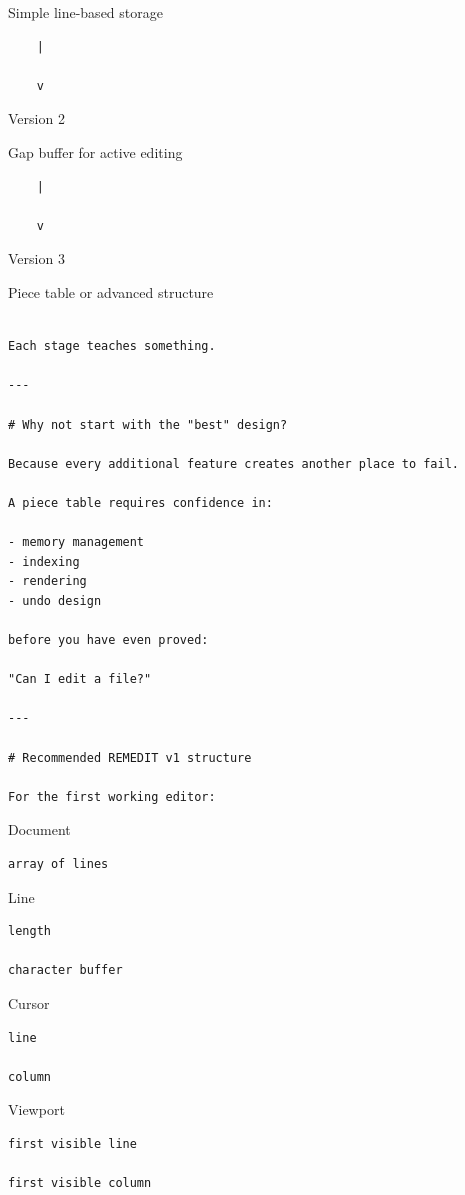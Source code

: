 \documentclass[
  oneside,
  openany]{book}
\begin{document}
Simple line-based storage

\begin{verbatim}
    |

    v
\end{verbatim}

Version 2

Gap buffer for active editing

\begin{verbatim}
    |

    v
\end{verbatim}

Version 3

Piece table or advanced structure

\begin{verbatim}

Each stage teaches something.

---

# Why not start with the "best" design?

Because every additional feature creates another place to fail.

A piece table requires confidence in:

- memory management
- indexing
- rendering
- undo design

before you have even proved:

"Can I edit a file?"

---

# Recommended REMEDIT v1 structure

For the first working editor:
\end{verbatim}

Document

\begin{verbatim}
array of lines
\end{verbatim}

Line

\begin{verbatim}
length

character buffer
\end{verbatim}

Cursor

\begin{verbatim}
line

column
\end{verbatim}

Viewport

\begin{verbatim}
first visible line

first visible column
\end{verbatim}
\end{document}
